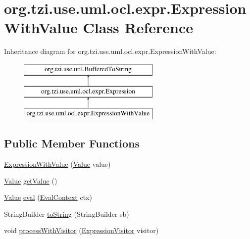 \hypertarget{classorg_1_1tzi_1_1use_1_1uml_1_1ocl_1_1expr_1_1_expression_with_value}{\section{org.\-tzi.\-use.\-uml.\-ocl.\-expr.\-Expression\-With\-Value Class Reference}
\label{classorg_1_1tzi_1_1use_1_1uml_1_1ocl_1_1expr_1_1_expression_with_value}
}
Inheritance diagram for org.\-tzi.\-use.\-uml.\-ocl.\-expr.\-Expression\-With\-Value\-:\begin{figure}[H]
\begin{center}
\leavevmode
\includegraphics[height=3.000000cm]{classorg_1_1tzi_1_1use_1_1uml_1_1ocl_1_1expr_1_1_expression_with_value}
\end{center}
\end{figure}
\subsection*{Public Member Functions}
\begin{DoxyCompactItemize}
\item 
\hyperlink{classorg_1_1tzi_1_1use_1_1uml_1_1ocl_1_1expr_1_1_expression_with_value_abbaeab145e741748f0ea4b8e93d8ebbc}{Expression\-With\-Value} (\hyperlink{classorg_1_1tzi_1_1use_1_1uml_1_1ocl_1_1value_1_1_value}{Value} value)
\item 
\hyperlink{classorg_1_1tzi_1_1use_1_1uml_1_1ocl_1_1value_1_1_value}{Value} \hyperlink{classorg_1_1tzi_1_1use_1_1uml_1_1ocl_1_1expr_1_1_expression_with_value_a11371320ccd95441cc27e9f235e9e4eb}{get\-Value} ()
\item 
\hyperlink{classorg_1_1tzi_1_1use_1_1uml_1_1ocl_1_1value_1_1_value}{Value} \hyperlink{classorg_1_1tzi_1_1use_1_1uml_1_1ocl_1_1expr_1_1_expression_with_value_a941bcc85740ac29e67be28f7df995b93}{eval} (\hyperlink{classorg_1_1tzi_1_1use_1_1uml_1_1ocl_1_1expr_1_1_eval_context}{Eval\-Context} ctx)
\item 
String\-Builder \hyperlink{classorg_1_1tzi_1_1use_1_1uml_1_1ocl_1_1expr_1_1_expression_with_value_adfdd419a2fddc0de5ff2eb71bf92ddca}{to\-String} (String\-Builder sb)
\item 
void \hyperlink{classorg_1_1tzi_1_1use_1_1uml_1_1ocl_1_1expr_1_1_expression_with_value_a423df31be626f97d5c6ea41a930600fc}{process\-With\-Visitor} (\hyperlink{interfaceorg_1_1tzi_1_1use_1_1uml_1_1ocl_1_1expr_1_1_expression_visitor}{Expression\-Visitor} visitor)
\end{DoxyCompactItemize}

